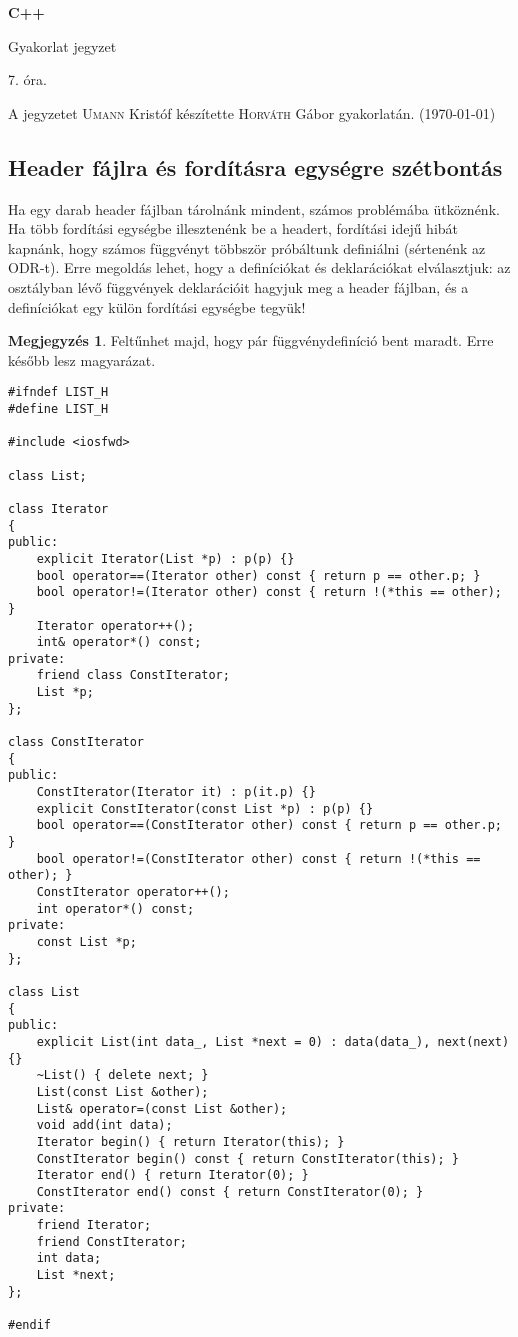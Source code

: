 \documentclass[a4paper,11.5pt,table]{article}
\begin{document}
	\setlength\parindent{0pt}
	\def\<{<\hspace{0mm}<}
	
	\theoremstyle{definition}
	\newtheorem{note}{Megjegyzés}[subsection]
	
	\begin{center}
		{\LARGE\textbf{C++}}
		
		{\Large Gyakorlat jegyzet}
		
		7. óra.
	\end{center}
	A jegyzetet \textsc{Umann} Kristóf készítette \textsc{Horváth} Gábor gyakorlatán. (\today)
	\subsection{Header fájlra és fordításra egységre szétbontás}
	Ha egy darab header fájlban tárolnánk mindent, számos problémába ütköznénk. Ha több fordítási egységbe illesztenénk be a headert, fordítási idejű hibát kapnánk, hogy számos függvényt többször próbáltunk definiálni (sértenénk az ODR-t). Erre megoldás lehet, hogy a definíciókat és deklarációkat elválasztjuk: az osztályban lévő függvények deklarációit hagyjuk meg a header fájlban, és a definíciókat egy külön fordítási egységbe tegyük!
	
	\begin{note}
		Feltűnhet majd, hogy pár függvénydefiníció bent maradt. Erre később lesz magyarázat.
	\end{note}
	
	\medskip
\begin{lstlisting}
#ifndef LIST_H
#define LIST_H

#include <iosfwd>

class List;

class Iterator 
{
public:
	explicit Iterator(List *p) : p(p) {}
	bool operator==(Iterator other) const { return p == other.p; }
	bool operator!=(Iterator other) const { return !(*this == other); }
	Iterator operator++();
	int& operator*() const;
private:
	friend class ConstIterator;
	List *p;
};

class ConstIterator
{
public:
	ConstIterator(Iterator it) : p(it.p) {}
	explicit ConstIterator(const List *p) : p(p) {}
	bool operator==(ConstIterator other) const { return p == other.p; }
	bool operator!=(ConstIterator other) const { return !(*this == other); }
	ConstIterator operator++();
	int operator*() const;
private:
	const List *p;
};

class List 
{
public:
	explicit List(int data_, List *next = 0) : data(data_), next(next) {}
	~List() { delete next; }
	List(const List &other);
	List& operator=(const List &other);
	void add(int data);
	Iterator begin() { return Iterator(this); }
	ConstIterator begin() const { return ConstIterator(this); }
	Iterator end() { return Iterator(0); }
	ConstIterator end() const { return ConstIterator(0); }
private:
	friend Iterator;
	friend ConstIterator;
	int data;
	List *next;
};

#endif
\end{lstlisting}
\end{document}

